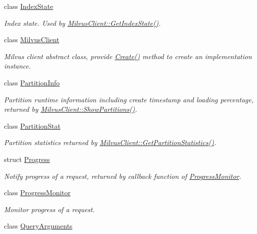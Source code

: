 \begin{DoxyCompactItemize}
class \hyperlink{classmilvus_1_1_index_state}{Index\+State}
\begin{DoxyCompactList}\small\item\em Index state. Used by \hyperlink{classmilvus_1_1_milvus_client_ad4abd1fc1153cd777a5080aa2ad8ca2b}{Milvus\+Client\+::\+Get\+Index\+State()}. \end{DoxyCompactList}\item 
class \hyperlink{classmilvus_1_1_milvus_client}{Milvus\+Client}
\begin{DoxyCompactList}\small\item\em Milvus client abstract class, provide \hyperlink{classmilvus_1_1_milvus_client_a2fadefe95c16f9a5ea11bc899fc878bd}{Create()} method to create an implementation instance. \end{DoxyCompactList}\item 
class \hyperlink{classmilvus_1_1_partition_info}{Partition\+Info}
\begin{DoxyCompactList}\small\item\em Partition runtime information including create timestamp and loading percentage, returned by \hyperlink{classmilvus_1_1_milvus_client_a12b481158b57a806f8d341178348f735}{Milvus\+Client\+::\+Show\+Partitions()}. \end{DoxyCompactList}\item 
class \hyperlink{classmilvus_1_1_partition_stat}{Partition\+Stat}
\begin{DoxyCompactList}\small\item\em Partition statistics returned by \hyperlink{classmilvus_1_1_milvus_client_a91ad7ca6b18c8c1eafd10ea0d6af1c61}{Milvus\+Client\+::\+Get\+Partition\+Statistics()}. \end{DoxyCompactList}\item 
struct \hyperlink{structmilvus_1_1_progress}{Progress}
\begin{DoxyCompactList}\small\item\em Notify progress of a request, returned by callback function of \hyperlink{classmilvus_1_1_progress_monitor}{Progress\+Monitor}. \end{DoxyCompactList}\item 
class \hyperlink{classmilvus_1_1_progress_monitor}{Progress\+Monitor}
\begin{DoxyCompactList}\small\item\em Monitor progress of a request. \end{DoxyCompactList}\item 
class \hyperlink{classmilvus_1_1_query_arguments}{Query\+Arguments}

\end{DoxyCompactItemize}
